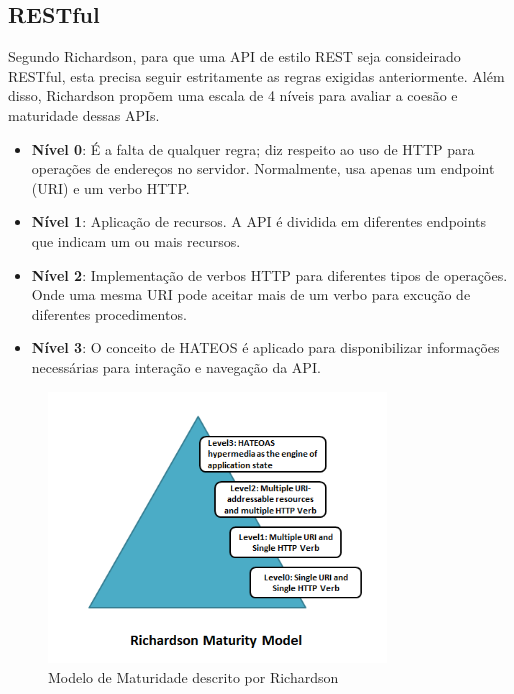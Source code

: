 \subsection[RESTful]{RESTful}

Segundo Richardson, para que uma API de estilo REST seja consideirado RESTful, esta precisa seguir estritamente as regras exigidas anteriormente. Além disso, Richardson propõem uma escala de 4 níveis para avaliar a coesão e maturidade dessas APIs. \cite{RichardsonEtAl2013}

\begin{itemize}[noitemsep]
\item \textbf{Nível 0}: É a falta de qualquer regra; diz respeito ao uso de HTTP para operações de endereços no servidor. Normalmente, usa apenas um endpoint (URI) e um verbo HTTP.
\item \textbf{Nível 1}: Aplicação de recursos. A API é dividida em diferentes endpoints que indicam um ou mais recursos.
\item \textbf{Nível 2}: Implementação de verbos HTTP para diferentes tipos de operações. Onde uma mesma URI pode aceitar mais de um verbo para excução de diferentes procedimentos.
\item \textbf{Nível 3}: O conceito de HATEOS é aplicado para disponibilizar informações necessárias para interação e navegação da API.
\end{itemize}

\begin{figure}[H]
  \centering
  \includegraphics[width=0.8\textwidth,height=\textheight,keepaspectratio]{figuras/richardson-maturity-model.png}
  \caption{Modelo de Maturidade descrito por Richardson}
\end{figure}
